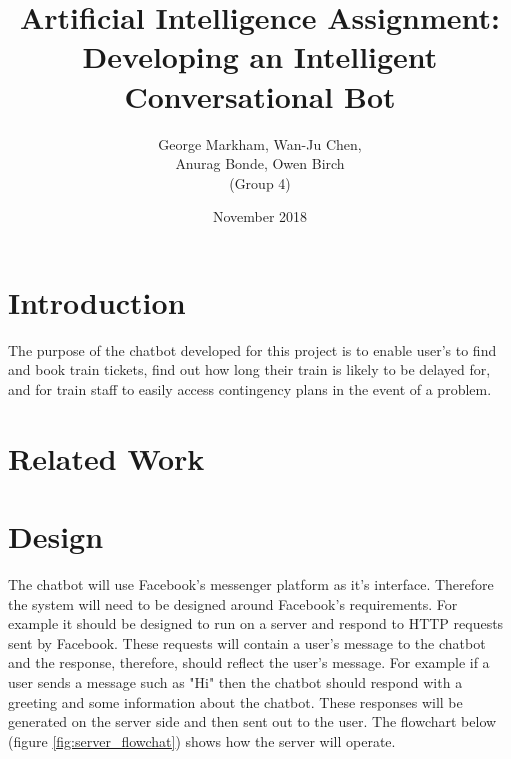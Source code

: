\documentclass[12pt,a4paper]{article}
\title{Artificial Intelligence Assignment: Developing an Intelligent Conversational Bot}
\author{George Markham, Wan-Ju Chen, \\ Anurag Bonde, Owen Birch \\ (Group 4)} %
\date{November 2018}
\begin{document}
    \maketitle
    \section{Introduction}
    The purpose of the chatbot developed for this project is to enable user's to find and book train tickets, find out how long their train is likely to be delayed for, and for train staff to easily access contingency plans in the event of a problem.
    \section{Related Work}
    \section{Design}
    The chatbot will use Facebook's messenger platform as it's interface. Therefore the system will need to be designed around Facebook's requirements. For example it should be designed to run on a server and respond to HTTP requests sent by Facebook. These requests will contain a user's message to the chatbot and the response, therefore, should reflect the user's message. For example if a user sends a message such as "Hi" then the chatbot should respond with a greeting and some information about the chatbot. These responses will be generated on the server side and then sent out to the user. The flowchart below (figure \ref{fig:server_flowchat}) shows how the server will operate.
    
\end{document}
